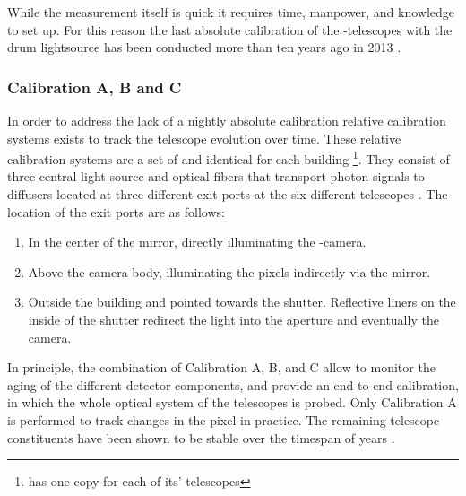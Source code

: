 While the measurement itself is quick it requires time, manpower, and knowledge
to set up. For this reason the last absolute calibration of the \FD-telescopes 
with the drum lightsource has been conducted more than ten years ago in 2013 
\cite{dorofeevFDAbsoluteCalibration2013}. 

\subsubsection{Calibration A, B and C}

In order to address the lack of a nightly absolute calibration relative 
calibration systems exists to track the telescope evolution over time. These 
relative calibration systems are a set of \LCUs and identical for each building
\footnote{\HEAT has one copy for each of its' telescopes}.
They consist of three central \LED light source and optical fibers that 
transport photon signals to diffusers located at three different exit ports at 
the six different telescopes \cite{robertsCalibrationPierreAuger2003}. The 
location of the exit ports are as follows:

\begin{enumerate}[label=(\Alph*)]
	\item In the center of the mirror, directly illuminating the \FD-camera.
	\item Above the camera body, illuminating the pixels indirectly via the 
	mirror.
	\item Outside the \FD building and pointed towards the shutter.
	Reflective liners on the inside of the shutter redirect the light into 
	the aperture and eventually the camera.
\end{enumerate}

In principle, the combination of Calibration A, B, and C allow to monitor the 
aging of the different detector components, and provide an end-to-end 
calibration, in which the whole optical system of the telescopes is probed. Only
Calibration A is performed to track changes in the pixel-\PMTs in practice. The 
remaining telescope constituents have been shown to be stable over the timespan 
of years \cite{brackAugerFluorescenceDetector2013, 
dorofeevFDAbsoluteCalibration2013}.

